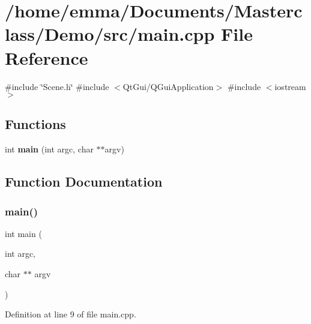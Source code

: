 \section{/home/emma/\+Documents/\+Masterclass/\+Demo/src/main.cpp File Reference}
\label{main_8cpp}
{\ttfamily \#include \char`\"{}Scene.\+h\char`\"{}}\newline
{\ttfamily \#include $<$Qt\+Gui/\+Q\+Gui\+Application$>$}\newline
{\ttfamily \#include $<$iostream$>$}\newline
\subsection*{Functions}
\begin{DoxyCompactItemize}
\item 
int \textbf{ main} (int argc, char $\ast$$\ast$argv)
\end{DoxyCompactItemize}


\subsection{Function Documentation}
\mbox{\label{main_8cpp_a3c04138a5bfe5d72780bb7e82a18e627}} 
\subsubsection{main()}
{\footnotesize\ttfamily int main (\begin{DoxyParamCaption}\item[{int}]{argc,  }\item[{char $\ast$$\ast$}]{argv }\end{DoxyParamCaption})}



Definition at line 9 of file main.\+cpp.

